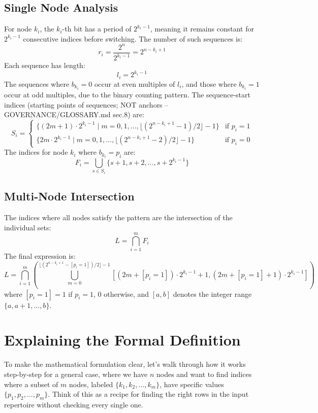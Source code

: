 \documentclass[12pt]{article}
\begin{document}
\subsection{Single Node Analysis}
For node \( k_i \), the \( k_i \)-th bit has a period of \( 2^{k_i - 1} \), meaning it remains constant for \( 2^{k_i - 1} \) consecutive indices before switching. The number of such sequences is:
\[
r_i = \frac{2^n}{2^{k_i - 1}} = 2^{n - k_i + 1}
\]
Each sequence has length:
\[
l_i = 2^{k_i - 1}
\]
The sequences where \( b_{k_i} = 0 \) occur at even multiples of \( l_i \), and those where \( b_{k_i} = 1 \) occur at odd multiples, due to the binary counting pattern. The sequence-start indices (starting points of sequences; NOT anchors -- GOVERNANCE/GLOSSARY.md sec.8) are:
\[
S_i =
\begin{cases}
\{ (2m + 1) \cdot 2^{k_i - 1} \mid m = 0, 1, \dots, \lfloor (2^{n - k_i + 1} - 1) / 2 \rfloor - 1 \} & \text{if } p_i = 1 \\
\{ 2m \cdot 2^{k_i - 1} \mid m = 0, 1, \dots, \lfloor (2^{n - k_i + 1} - 2) / 2 \rfloor - 1 \} & \text{if } p_i = 0
\end{cases}
\]
The indices for node \( k_i \) where \( b_{k_i} = p_i \) are:
\[
F_i = \bigcup_{s \in S_i} \{ s + 1, s + 2, \dots, s + 2^{k_i - 1} \}
\]

\subsection{Multi-Node Intersection}
The indices where all nodes satisfy the pattern are the intersection of the individual sets:
\[
L = \bigcap_{i=1}^m F_i
\]
The final expression is:
\[
L = \bigcap_{i=1}^m \left( \bigcup_{m=0}^{\lfloor (2^{n - k_i + 1} - [p_i = 1]) / 2 \rfloor - 1} \left[ (2m + [p_i = 1]) \cdot 2^{k_i - 1} + 1, (2m + [p_i = 1] + 1) \cdot 2^{k_i - 1} \right] \right)
\]
where \( [p_i = 1] = 1 \) if \( p_i = 1 \), 0 otherwise, and \( [a, b] \) denotes the integer range \( \{a, a+1, \dots, b\} \).

\section{Explaining the Formal Definition}
To make the mathematical formulation clear, let’s walk through how it works step-by-step for a general case, where we have \( n \) nodes and want to find indices where a subset of \( m \) nodes, labeled \( \{k_1, k_2, \dots, k_m\} \), have specific values \( \{p_1, p_2, \dots, p_m\} \). Think of this as a recipe for finding the right rows in the input repertoire without checking every single one.
\end{document}
